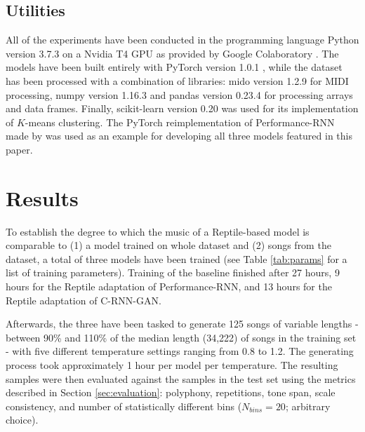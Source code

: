 \documentclass[a4paper]{book}
\begin{document}
\section{Utilities}

All of the experiments have been conducted in the programming language Python version 3.7.3 \parencite{rossum_python_2019} on a Nvidia T4 GPU as provided by Google Colaboratory \parencite{google_colaboratory_2019}. The models have been built entirely with PyTorch version 1.0.1 \parencite{paszke_automatic_2017}, while the dataset has been processed with a combination of libraries: mido version 1.2.9 \parencite{bjorndalen_mido_2018} for MIDI processing, numpy version 1.16.3 \parencite{walt_numpy_2011} and pandas version 0.23.4 \parencite{mckinney_data_2010} for processing arrays and data frames. Finally, scikit-learn version 0.20 \parencite{pedregosa_scikit-learn_2011} was used for its implementation of $K$-means clustering. The PyTorch reimplementation of Performance-RNN made by \textcite{lee_event-based_2019} was used as an example for developing all three models featured in this paper.

\chapter{Results}\label{chap:results}

To establish the degree to which the music of a Reptile-based model is comparable to (1) a model trained on whole dataset and (2) songs from the dataset, a total of three models have been trained (see Table \ref{tab:params} for a list of training parameters). Training of the baseline finished after 27 hours, 9 hours for the Reptile adaptation of Performance-RNN, and 13 hours for the Reptile adaptation of C-RNN-GAN.

Afterwards, the three have been tasked to generate 125 songs of variable lengths - between 90\% and 110\% of the median length (34,222) of songs in the training set - with five different temperature settings ranging from 0.8 to 1.2. The generating process took approximately 1 hour per model per temperature. The resulting samples were then evaluated against the samples in the test set using the metrics described in Section \ref{sec:evaluation}: polyphony, repetitions, tone span, scale consistency, and number of statistically different bins ($N_{bins} = 20$; arbitrary choice).
\end{document}
